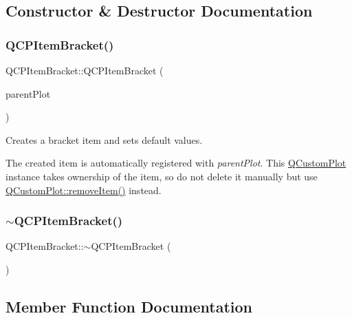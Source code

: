 \subsection{Constructor \& Destructor Documentation}
\mbox{\label{class_q_c_p_item_bracket_a44ecfa37a76de5e3549e2d61f9d8ee56}} 
\subsubsection{\texorpdfstring{QCPItemBracket()}{QCPItemBracket()}}
{\footnotesize\ttfamily Q\+C\+P\+Item\+Bracket\+::\+Q\+C\+P\+Item\+Bracket (\begin{DoxyParamCaption}\item[{\mbox{\hyperlink{class_q_custom_plot}{Q\+Custom\+Plot}} $\ast$}]{parent\+Plot }\end{DoxyParamCaption})\hspace{0.3cm}{\ttfamily [explicit]}}

Creates a bracket item and sets default values.

The created item is automatically registered with {\itshape parent\+Plot}. This \mbox{\hyperlink{class_q_custom_plot}{Q\+Custom\+Plot}} instance takes ownership of the item, so do not delete it manually but use \mbox{\hyperlink{class_q_custom_plot_ae04446557292551e8fb6e2c106e1848d}{Q\+Custom\+Plot\+::remove\+Item()}} instead. \mbox{\label{class_q_c_p_item_bracket_ad773c3e8e09868d6f8caeb92c54919f4}} 
\subsubsection{\texorpdfstring{$\sim$QCPItemBracket()}{~QCPItemBracket()}}
{\footnotesize\ttfamily Q\+C\+P\+Item\+Bracket\+::$\sim$\+Q\+C\+P\+Item\+Bracket (\begin{DoxyParamCaption}{ }\end{DoxyParamCaption})\hspace{0.3cm}{\ttfamily [virtual]}}



\subsection{Member Function Documentation}
\mbox{\label{class_q_c_p_item_bracket_a008d87325d26b6616d368cec06027cce}} 

